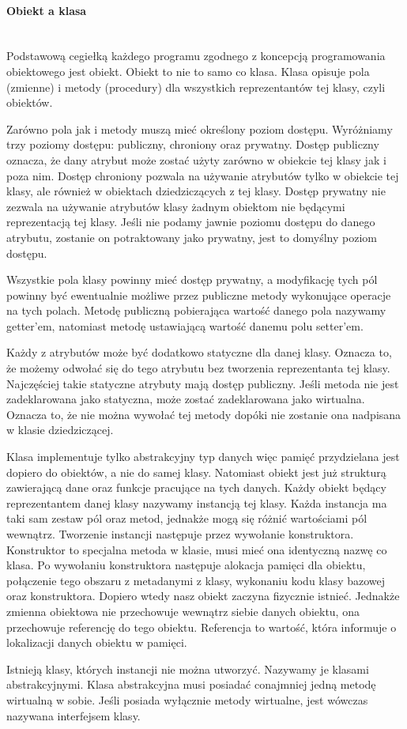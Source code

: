 \documentclass{article}
\numberwithin{equation}{section}
\begin{document}
\paragraph{Obiekt a klasa}\mbox{}\\
Podstawową cegiełką każdego programu zgodnego z koncepcją programowania obiektowego jest obiekt. Obiekt to nie to samo co klasa. Klasa opisuje pola (zmienne) i metody (procedury) dla wszystkich reprezentantów tej klasy, czyli obiektów.\par Zarówno pola jak i metody muszą mieć określony poziom dostępu. Wyróżniamy trzy poziomy dostępu: publiczny, chroniony oraz prywatny. Dostęp publiczny oznacza, że dany atrybut może zostać użyty zarówno w obiekcie tej klasy jak i poza nim. Dostęp chroniony pozwala na używanie atrybutów tylko w obiekcie tej klasy, ale również w obiektach dziedziczących z tej klasy. Dostęp prywatny nie zezwala na używanie atrybutów klasy żadnym obiektom nie będącymi reprezentacją tej klasy. Jeśli nie podamy jawnie poziomu dostępu do danego atrybutu, zostanie on potraktowany jako prywatny, jest to domyślny poziom dostępu.\par Wszystkie pola klasy powinny mieć dostęp prywatny, a modyfikację tych pól powinny być ewentualnie możliwe przez publiczne metody wykonujące operacje na tych polach. Metodę publiczną pobierająca wartość danego pola nazywamy getter'em, natomiast metodę ustawiającą wartość danemu polu setter'em.\par Każdy z atrybutów może być dodatkowo statyczne dla danej klasy. Oznacza to, że możemy odwołać się do tego atrybutu bez tworzenia reprezentanta tej klasy. Najczęściej takie statyczne atrybuty mają dostęp publiczny. Jeśli metoda nie jest zadeklarowana jako statyczna, może zostać zadeklarowana jako wirtualna. Oznacza to, że nie można wywołać tej metody dopóki nie zostanie ona nadpisana w klasie dziedziczącej.\par Klasa implementuje tylko abstrakcyjny typ danych więc pamięć przydzielana jest dopiero do obiektów, a nie do samej klasy. Natomiast obiekt jest już strukturą zawierającą dane oraz funkcje pracujące na tych danych. Każdy obiekt będący reprezentantem danej klasy nazywamy instancją tej klasy. Każda instancja ma taki sam zestaw pól oraz metod, jednakże mogą się różnić wartościami pól wewnątrz. Tworzenie instancji następuje przez wywołanie konstruktora. Konstruktor to specjalna metoda w klasie, musi mieć ona identyczną nazwę co klasa. Po wywołaniu konstruktora następuje alokacja pamięci dla obiektu, połączenie tego obszaru z metadanymi z klasy, wykonaniu kodu klasy bazowej oraz konstruktora. Dopiero wtedy nasz obiekt zaczyna fizycznie istnieć. Jednakże zmienna obiektowa nie przechowuje wewnątrz siebie danych obiektu, ona przechowuje referencję do tego obiektu. Referencja to wartość, która informuje o lokalizacji danych obiektu w pamięci.\par Istnieją klasy, których instancji nie można utworzyć. Nazywamy je klasami abstrakcyjnymi. Klasa abstrakcyjna musi posiadać conajmniej jedną metodę wirtualną w sobie. Jeśli posiada wyłącznie metody wirtualne, jest wówczas nazywana interfejsem klasy.
\end{document}
